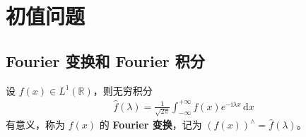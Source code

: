 \documentclass[../../main.tex]{subfiles}%
\begin{document}
\section{初值问题}

\subsection{Fourier 变换和 Fourier 积分}

\begin{definition}
设 $f(x)\in L^1(\mathbb{R})$，则无穷积分
\begin{align}
\hat{f}(\lambda)=\frac{1}{\sqrt{2\pi}}\int_{-\infty}^{+\infty}f(x)e^{-\mathrm{i}\lambda  x}\,\mathrm{d}x \label{eq:fourier-def}
\end{align}
有意义，称为 $f(x)$ 的 \textbf{Fourier 变换}，记为 $(f(x))^\wedge=\hat{f}(\lambda)$。
\end{definition}
\end{document}
